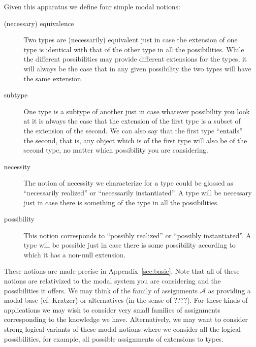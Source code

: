 Given this apparatus we define four simple modal notions:
\begin{description}

\item[(necessary) equivalence] Two types are (necessarily) equivalent
  just in case the extension of one type is identical with that of
  the other type in all the possibilities.  While the different
  possibilities may provide different extensions for the types, it
  will always be the case that in any given possibility the two types
  will have the same extension.

\item[subtype] One type is a subtype of another just in case whatever
  possibility you look at it is always the case that the extension of
  the first type is a subset of the extension of the second.  We can
  also say that the first type ``entails'' the second, that is, any
  object which is of the first type will also be of the second type,
  no matter which possibility you are considering.

\item[necessity] The notion of necessity we characterize for a type
  could be glossed as ``necessarily realized'' or ``necessarily
  instantiated''.  A type will be necessary just in case there is
  something of the type in all the possibilities.

\item[possibility] This notion corresponds to ``possibly realized'' or
  ``possibly instantiated''.  A type will be possible just in case
  there is some possibility according to which it has a non-null
  extension.

\end{description}
These notions are made precise in Appendix~\ref{sec:basic}.  Note that
all of these notions are relativized to the modal system you are
considering and the possibilities it offers.  We may think of the
family of assignments $\mathcal{A}$ as providing a modal base
(cf. Kratzer) or alternatives (in the sense of ????).  For these kinds
of applications we may wish to consider very small families of
assignments corresponding to the knowledge we have.  Alternatively, we
may want to consider strong logical variants of these modal notions
where we consider all the logical possibilities, for example, all
possible assignments of extensions to types.

